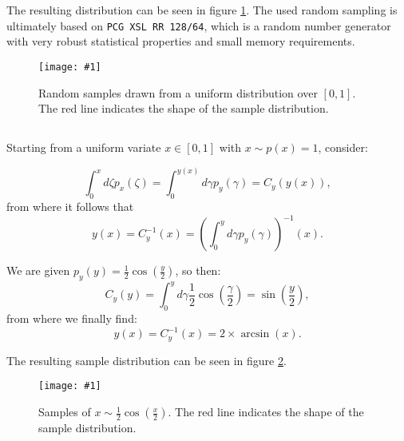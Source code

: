 \documentclass[10pt, a4paper]{article}
\newcommand{\plot}[3]{\begin{figure}[ht]\centering\texttt{[image: \#1]}\caption{#2}\label{#3}\end{figure}}
\begin{document}
  \subsection{}

\section{}
  \subsection{}
  The resulting distribution can be seen in figure \ref{fig:uniform}. The used random sampling
  is ultimately based on \texttt{PCG XSL RR 128/64}, which is a random number generator with
  very robust statistical properties and small memory requirements\cite{pcg}.

  \plot{assignment-q-5-a}{
    Random samples drawn from a uniform distribution over $[0,1]$. The red line indicates the shape of
    the sample distribution.
  }{fig:uniform}

  \subsection{}
  \label{sec:sample}
  Starting from a uniform variate $x \in [0,1]$ with $x \sim p(x) = 1$, consider:

  \begin{equation}
  \int_0^x d\zeta p_x(\zeta) = \int_0^{y(x)} d\gamma p_y(\gamma) = C_y(y(x)),
  \end{equation}
  from where it follows that
  \begin{equation}
  y(x) = C_y^{-1}(x) = \left(\int_0^y d\gamma p_y(\gamma)\right)^{-1}(x).
  \end{equation}

  We are given $p_y(y) = \frac{1}{2} \cos(\frac{y}{2})$, so then:
  \begin{equation}
  C_y(y) = \int_0^y d\gamma \frac{1}{2} \cos(\frac{\gamma}{2}) = \sin(\frac{y}{2}),
  \end{equation}
  from where we finally find:
  \begin{equation}
  y(x) = C_y^{-1}(x) = 2 \times \arcsin(x).
  \end{equation}

  The resulting sample distribution can be seen in figure \ref{fig:sample}.

  \plot{assignment-q-5-b}{
    Samples of $x \sim \frac{1}{2} \cos(\frac{x}{2})$. The red line indicates the shape of
    the sample distribution.
  }{fig:sample}
\end{document}
